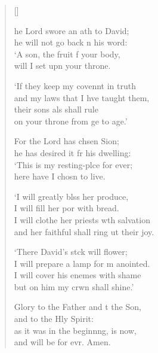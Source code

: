 \settowidth{\versewidth}{I will clothe her priests with salvation *}
\begin{verse}[\versewidth]
  \begin{patverse}
he Lord swore an ath to David;\Med\\
    he will not go back n his word:\\
‘A son, the fruit f your body,\Med\\
    will I set upn your throne.

‘If they keep my covennt in truth\Med\\
    and my laws that I hve taught them,\\
their sons als shall rule\Med\\
    on your throne from ge to age.’

For the Lord has chsen Sion;\Med\\
    he has desired it fr his dwelling:\\
‘This is my resting-plce for ever;\Med\\
    here have I chosn to live.

‘I will greatly blss her produce,\Med\\
    I will fill her por with bread.\\
I will clothe her priests w\pointup{\i}th salvation\Med\\
    and her faithful shall ring ut their joy.

‘There David’s stck will flower;\Med\\
    I will prepare a lamp for m anointed.\\
I will cover his enem\pointup{\i}es with shame\Med\\
    but on him my crwn shall shine.’

Glory to the Father and t the Son,\Med\\
    and to the Hly Spirit:\\
as it was in the beginn\pointup{\i}ng, is now,\Med\\
    and will be for evr. Amen.
  \end{patverse}
\end{verse}
